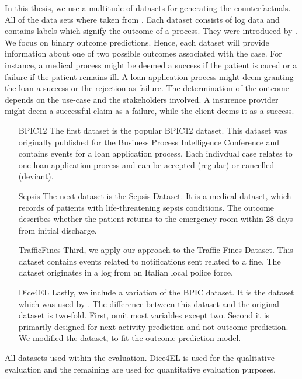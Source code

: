 \documentclass[./../../paper.tex]{subfiles}
\begin{document}
In this thesis, we use a multitude of datasets for generating the counterfactuals. All of the data sets where taken from \citeauthor{teinemaa_OutcomeOrientedPredictiveProcess_2018a}. Each dataset consists of log data and contains labels which signify the outcome of a process. They were introduced by . We focus on binary outcome predictions. Hence, each dataset will provide information about one of two possible outcomes associated with the case. For instance, a medical process might be deemed a success if the patient is cured or a failure if the patient remains ill. A loan application process might deem granting the loan a success or the rejection as failure. The determination of the outcome depends on the use-case and the stakeholders involved. A insurence provider might deem a successful claim as a failure, while the client deems it as a success.

\begin{enumerate}
    \item[BPIC12] The first dataset is the popular BPIC12 dataset. This dataset was originally published for the Business Process Intelligence Conference and contains events for a loan application process. Each indivdual case relates to one loan application process and can be accepted (regular) or cancelled (deviant).
    \item[Sepsis] The next dataset is the Sepsis-Dataset. It is a medical dataset, which records of patients with life-threatening sepsis conditions. The outcome describes whether the patient returns to the emergency room within 28 days from initial discharge.
    \item[TrafficFines] Third, we apply our approach to the Traffic-Fines-Dataset. This dataset contains events related to notifications sent related to a fine. The dataset originates in a log from an Italian local police force.
    \item[Dice4EL] Lastly, we include a variation of the BPIC dataset. It is the dataset which was used by \citeauthor{hsieh_DiCE4ELInterpretingProcess_2021}. The difference between this dataset and the original dataset is two-fold. First, \citeauthor{hsieh_DiCE4ELInterpretingProcess_2021} omit most variables except two. Second it is primarily designed for next-activity prediction and not outcome prediction. We modified the dataset, to fit the outcome prediction model.
\end{enumerate}

\begin{table}[htbp]
    \label{tbl:datasetstats}
    \caption{All datasets used within the evaluation. Dice4EL is used for the qualitative evaluation and the remaining are used for quantitative evaluation purposes.}
        \makebox[\linewidth]{
        
        }
\end{table}
\end{document}
